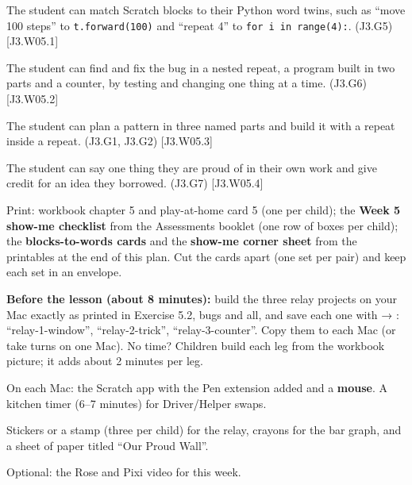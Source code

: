 
\begin{objectives}
  \item The student can match Scratch blocks to their Python word twins, such as \enquote{move 100 steps} to \texttt{t.forward(100)} and \enquote{repeat 4} to \texttt{for i in range(4):}. (J3.G5) [J3.W05.1]
  \item The student can find and fix the bug in a nested repeat, a program built in two parts and a counter, by testing and changing one thing at a time. (J3.G6) [J3.W05.2]
  \item The student can plan a pattern in three named parts and build it with a repeat inside a repeat. (J3.G1, J3.G2) [J3.W05.3]
  \item The student can say one thing they are proud of in their own work and give credit for an idea they borrowed. (J3.G7) [J3.W05.4]
\end{objectives}

\begin{materials}
  \item Print: workbook chapter 5 and play-at-home card 5 (one per child); the \textbf{Week 5 show-me checklist} from the Assessments booklet (one row of boxes per child); the \textbf{blocks-to-words cards} and the \textbf{show-me corner sheet} from the printables at the end of this plan. Cut the cards apart (one set per pair) and keep each set in an envelope.
  \item \textbf{Before the lesson (about 8 minutes):} build the three relay projects on your Mac exactly as printed in Exercise 5.2, bugs and all, and save each one with  → : \enquote{relay-1-window}, \enquote{relay-2-trick}, \enquote{relay-3-counter}. Copy them to each Mac (or take turns on one Mac). No time? Children build each leg from the workbook picture; it adds about 2 minutes per leg.
  \item On each Mac: the Scratch app with the Pen extension added and a \textbf{mouse}. A kitchen timer (6--7 minutes) for Driver/Helper swaps.
  \item Stickers or a stamp (three per child) for the relay, crayons for the bar graph, and a sheet of paper titled \enquote{Our Proud Wall}.
  \item Optional: the Rose and Pixi video for this week.
\end{materials}

